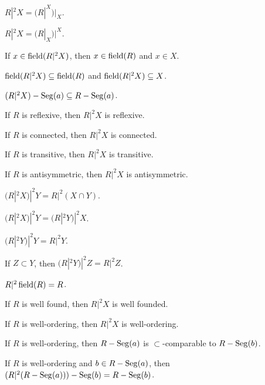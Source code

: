 \documentclass{article}
\begin{document}
\begin{thm}
\item\label{wellord1:10} $R|^{2}X=(R|^{X})|_{X}$.
\item\label{wellord1:11} $R|^{2}X=(R|_{X})|^{X}$.
\item\label{wellord1:12} If $x\in\operatorname{field}(R|^{2}X)$, then $x\in\operatorname{field}(R)$
  and $x\in X$.
\item\label{wellord1:13} $\operatorname{field}(R|^{2}X)\subseteq\operatorname{field}(R)$ and
  $\operatorname{field}(R|^{2}X)\subseteq X$.
\item\label{wellord1:14} $(R|^{2}X)-\operatorname{Seg}(a)\subseteq R-\operatorname{Seg}(a)$.
\item\label{wellord1:15} If $R$ is reflexive, then $R|^{2}X$ is reflexive.
\item\label{wellord1:16} If $R$ is connected, then $R|^{2}X$ is connected.
\item\label{wellord1:17} If $R$ is transitive, then $R|^{2}X$ is transitive.
\item\label{wellord1:18} If $R$ is antisymmetric, then $R|^{2}X$ is antisymmetric.
\item\label{wellord1:19} $(R|^{2}X)|^{2}Y=R|^{2}(X\cap Y)$.
\item\label{wellord1:20} $(R|^{2}X)|^{2}Y=(R|^{2}Y)|^{2}X$.
\item\label{wellord1:21} $(R|^{2}Y)|^{2}Y=R|^{2}Y$.
\item\label{wellord1:22} If $Z\subset Y$, then $(R|^{2}Y)|^{2}Z=R|^{2}Z$.
\item\label{wellord1:23} $R|^{2}\operatorname{field}(R)=R$.
\item\label{wellord1:24} If $R$ is well found, then $R|^{2}X$ is well founded.
\item\label{wellord1:25} If $R$ is well-ordering, then $R|^{2}X$ is well-ordering.
\item\label{wellord1:26} If $R$ is well-ordering, then $R-\operatorname{Seg}(a)$ is
  $\subset$-comparable to $R-\operatorname{Seg}(b)$.
\item\label{wellord1:27} If $R$ is well-ordering and $b\in R-\operatorname{Seg}(a)$,
  then $(R|^{2}(R-\operatorname{Seg}(a)))-\operatorname{Seg}(b)=R-\operatorname{Seg}(b)$.
\item\label{wellord1:28}%
\item\label{wellord1:29}
\item\label{wellord1:3}
\end{thm}
\end{document}
